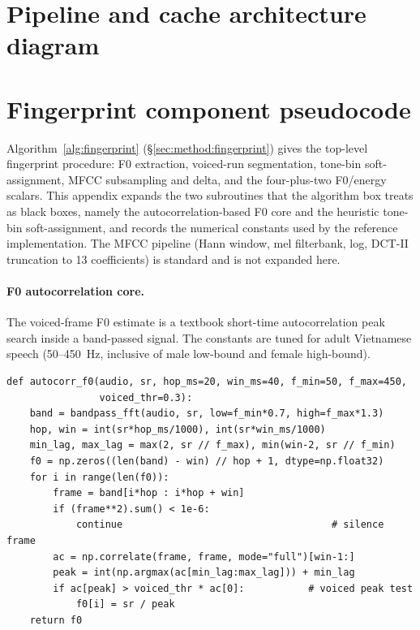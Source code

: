 \documentclass[a4paper,fleqn]{cas-dc}
\begin{document}
\FloatBarrier
\appendix
\section{Pipeline and cache architecture diagram}\label{app:pipeline}
\section{Fingerprint component pseudocode}\label{app:pseudocode}

Algorithm~\ref{alg:fingerprint} (\S\ref{sec:method:fingerprint}) gives the top-level fingerprint procedure: F0 extraction, voiced-run segmentation, tone-bin soft-assignment, MFCC subsampling and delta, and the four-plus-two F0/energy scalars. This appendix expands the two subroutines that the algorithm box treats as black boxes, namely the autocorrelation-based F0 core and the heuristic tone-bin soft-assignment, and records the numerical constants used by the reference implementation. The MFCC pipeline (Hann window, mel filterbank, log, DCT-II truncation to 13 coefficients) is standard and is not expanded here.

\paragraph{F0 autocorrelation core.} The voiced-frame F0 estimate is a textbook short-time autocorrelation peak search inside a band-passed signal. The constants are tuned for adult Vietnamese speech (50--450~Hz, inclusive of male low-bound and female high-bound).

{\footnotesize\begin{verbatim}
def autocorr_f0(audio, sr, hop_ms=20, win_ms=40, f_min=50, f_max=450,
                voiced_thr=0.3):
    band = bandpass_fft(audio, sr, low=f_min*0.7, high=f_max*1.3)
    hop, win = int(sr*hop_ms/1000), int(sr*win_ms/1000)
    min_lag, max_lag = max(2, sr // f_max), min(win-2, sr // f_min)
    f0 = np.zeros((len(band) - win) // hop + 1, dtype=np.float32)
    for i in range(len(f0)):
        frame = band[i*hop : i*hop + win]
        if (frame**2).sum() < 1e-6:
            continue                                    # silence frame
        ac = np.correlate(frame, frame, mode="full")[win-1:]
        peak = int(np.argmax(ac[min_lag:max_lag])) + min_lag
        if ac[peak] > voiced_thr * ac[0]:           # voiced peak test
            f0[i] = sr / peak
    return f0
\end{verbatim}}
\end{document}
